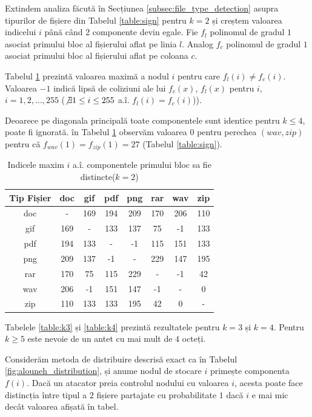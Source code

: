 \documentclass[oneside, 12pt]{book}
\begin{document}
Extindem analiza făcută în Secțiunea {\ref{subsec:file_type_detection}} asupra tipurilor de fișiere din Tabelul {\ref{table:sign}} pentru $k = 2$ și creștem valoarea indicelui $i$ până când 2 componente devin egale. Fie $f_l$ polinomul de gradul $1$ asociat primului bloc al fișierului aflat pe linia $l$. Analog $f_c$ polinomul de gradul $1$ asociat primului bloc al fișierului aflat pe coloana $c$.

Tabelul {\ref{table:k2} prezintă} valoarea maximă a nodul $i$ pentru care $f_l(i) \neq f_c(i)$. Valoarea $-1$ indică lipsă de coliziuni ale lui $f_c(x)$, $f_l(x)$ pentru $i$, $i = {1,2,\dots,255}$ ($\not\exists 1 \leq i \leq 255$ a.î. $f_l(i) = f_c(i)$)).

Deoarece pe diagonala principală toate componentele sunt identice pentru $k \leq 4$, poate fi ignorată. în Tabelul {\ref{table:k2}} observăm valoarea $0$ pentru perechea $(wav, zip)$ pentru că $f_{wav}(1) = f_{zip}(1) = 27$ (Tabelul \ref{table:sign}).



\begin{table}[h]
\begin{center}
\caption{Indicele maxim $i$ a.î. componentele primului bloc sa fie distincte($k=2$)}\label{tb:margins}
\label{table:k2}
\begin{tabular}{cccccccc}
Tip Fișier & doc & gif & pdf & png & rar & wav & zip \\\hline
  doc & - & 169 & 194 & 209 & 170 & 206 & 110\\
  gif & 169 & - & 133 & 137 & 75 & -1 & 133\\
  pdf & 194 & 133 & - & -1 & 115 & 151 & 133\\
  png & 209 & 137 & -1 & - & 229 & 147 & 195\\
  rar & 170 & 75 & 115 & 229 & - & -1 & 42\\
  wav & 206 & -1 & 151 & 147 & -1 & - & 0\\
  zip & 110 & 133 & 133 & 195 & 42 & 0 & -\\ \hline
\end{tabular}
\end{center}
\end{table}

Tabelele {\ref{table:k3} și \ref{table:k4}} prezintă rezultatele pentru $k = 3$ și $k = 4$. Pentru $k \geq 5$ este nevoie de un antet cu mai mult de $4$ octeți.

Considerăm metoda de distribuire descrisă exact ca în Tabelul {\ref{fig:alouneh_distribution}}, și anume nodul de stocare $i$ primește componenta $f(i)$.
Dacă un atacator preia controlul nodului cu valoarea $i$, acesta poate face distincția între tipul a $2$ fișiere partajate cu probabilitate $1$ dacă $i$ e mai mic decât valoarea afișată în tabel.
\end{document}
